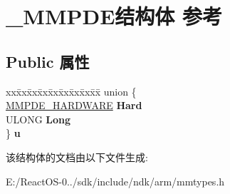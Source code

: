 \hypertarget{struct___m_m_p_d_e}{}\section{\+\_\+\+M\+M\+P\+D\+E结构体 参考}
\label{struct___m_m_p_d_e}
\subsection*{Public 属性}
\begin{DoxyCompactItemize}
\item 
\mbox{\label{struct___m_m_p_d_e_ae36306f75bd15eb0c4de0e11765f1914}} 
\begin{tabbing}
xx\=xx\=xx\=xx\=xx\=xx\=xx\=xx\=xx\=\kill
union \{\\
\>\hyperlink{union___m_m_p_d_e___h_a_r_d_w_a_r_e}{MMPDE\_HARDWARE} {\bfseries Hard}\\
\>ULONG {\bfseries Long}\\
\} {\bfseries u}\\

\end{tabbing}\end{DoxyCompactItemize}


该结构体的文档由以下文件生成\+:\begin{DoxyCompactItemize}
\item 
E\+:/\+React\+O\+S-\/0../sdk/include/ndk/arm/mmtypes.\+h\end{DoxyCompactItemize}
